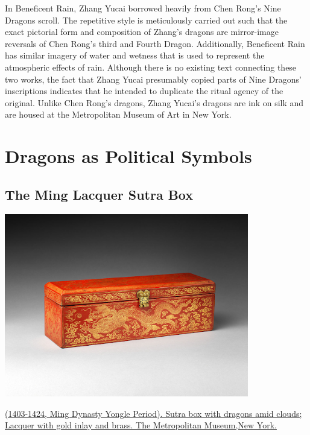 \documentclass[
]{book}
\begin{document}
In Beneficent Rain, Zhang Yucai borrowed heavily from Chen Rong's Nine Dragons scroll. The repetitive style is meticulously carried out such that the exact pictorial form and composition of Zhang's dragons are mirror-image reversals of Chen Rong's third and Fourth Dragon. Additionally, Beneficent Rain has similar imagery of water and wetness that is used to represent the atmospheric effects of rain. Although there is no existing text connecting these two works, the fact that Zhang Yucai presumably copied parts of Nine Dragons' inscriptions indicates that he intended to duplicate the ritual agency of the original. Unlike Chen Rong's dragons, Zhang Yucai's dragons are ink on silk and are housed at the Metropolitan Museum of Art in New York.

\hypertarget{ming}{%
\chapter*{Dragons as Political Symbols}\label{ming}}

\hypertarget{the-ming-lacquer-sutra-box}{%
\section*{The Ming Lacquer Sutra Box}\label{the-ming-lacquer-sutra-box}}

\includegraphics[width=0.8\textwidth,height=\textheight]{images/Ming_Lacquer_Sutra_Box.png}

\href{https://www.metmuseum.org/art/collection/search/60870}{(1403-1424, Ming Dynasty Yongle Period). Sutra box with dragons amid clouds; Lacquer with gold inlay and brass. The Metropolitan Museum,New York.}
\end{document}
